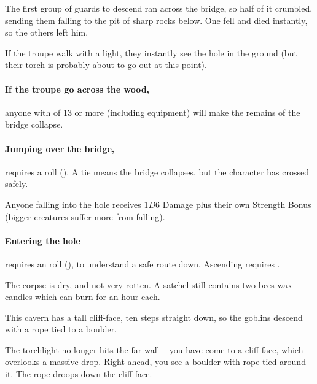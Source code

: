 \begin{multicols}{2}
\begin{exampletext}
  The first group of \glspl{guard} to descend ran across the bridge, so half of it crumbled, sending them falling to the pit of sharp rocks below.
  One fell and died instantly, so the others left him.
\end{exampletext}


If the troupe walk with a light, they instantly see the hole in the ground (but their torch is probably about to go out at this point).

\paragraph{If the troupe go across the wood,}
anyone with  of 13 or more (including \gls{equipment}) will make the remains of the bridge collapse.

\paragraph{Jumping over the bridge,}
requires a  roll (\tn[9]).
A tie means the bridge collapses, but the character has crossed safely.

Anyone falling into the hole receives $1D6$ Damage plus their own Strength Bonus (bigger creatures suffer more from falling).

\paragraph{Entering the hole}
requires an  roll (\tn[10]), to understand a safe route down.
Ascending requires \tn[12].

The corpse is dry, and not very rotten.
A satchel still contains two bees-wax candles which can burn for an hour each.




\begin{exampletext}
  This cavern has a tall cliff-face, ten \glspl{step} straight down, so the goblins descend with a rope tied to a boulder.
\end{exampletext}

\begin{boxtext}
  The torchlight no longer hits the far wall -- you have come to a cliff-face, which overlooks a massive drop.
  Right ahead, you see a boulder with rope tied around it.
  The rope droops down the cliff-face.


\end{boxtext}
\end{multicols}
